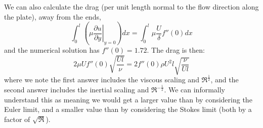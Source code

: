 \documentclass[../Main.tex]{subfiles}
\begin{document}
We can also calculate the drag (per unit length normal to the flow direction along the plate), away from the ends,
\begin{equation*}
    \int_0^l \left(\mu \left.\frac{\partial u}{\partial y}\right|_{y = 0}\right) dx = \int_{0}^{l} \mu \frac{U}{\delta} f''(0) dx
\end{equation*}
and the numerical solution has $f''(0) = 1.72$. The drag is then:
\begin{equation*}
    2\mu U f''(0) \sqrt{\frac{U l }{\nu}} = 2f''(0) \rho U^2 l \sqrt{\frac{\nu}{Ul}}
\end{equation*}
where we note the first answer includes the viscous scaling and $\Re^{\frac12}$, and the second answer includes the inertial scaling and $\Re^{-\frac12}$. We can informally understand this as meaning we would get a larger value than by considering the Euler limit, and a smaller value than by considering the Stokes limit (both by a factor of $\sqrt{\Re}$).
\end{document}

